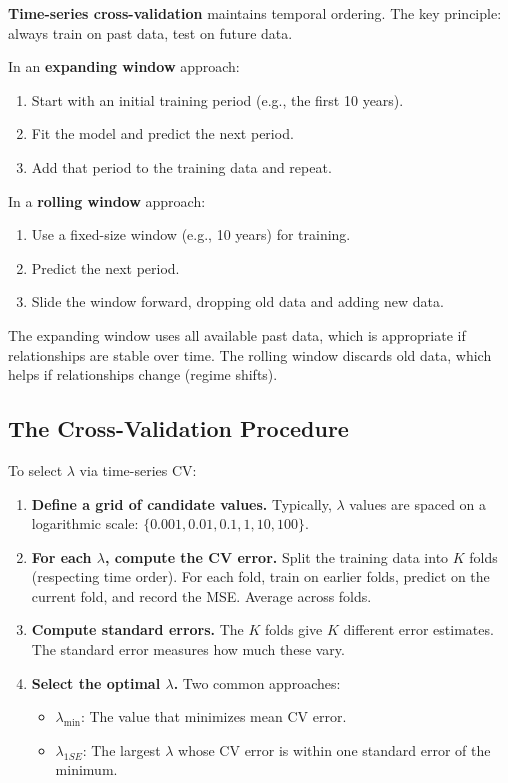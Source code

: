 \documentclass[11pt,a4paper]{article}
\newcommand{\keyword}[1]{\textbf{\textcolor{AccentOrange}{#1}}}
\begin{document}
\keyword{Time-series cross-validation} maintains temporal ordering. The key principle: always train on past data, test on future data.

In an \textbf{expanding window} approach:
\begin{enumerate}
    \item Start with an initial training period (e.g., the first 10 years).
    \item Fit the model and predict the next period.
    \item Add that period to the training data and repeat.
\end{enumerate}

In a \textbf{rolling window} approach:
\begin{enumerate}
    \item Use a fixed-size window (e.g., 10 years) for training.
    \item Predict the next period.
    \item Slide the window forward, dropping old data and adding new data.
\end{enumerate}

The expanding window uses all available past data, which is appropriate if relationships are stable over time. The rolling window discards old data, which helps if relationships change (regime shifts).

\subsection{The Cross-Validation Procedure}

To select $\lambda$ via time-series CV:

\begin{enumerate}
    \item \textbf{Define a grid of candidate values.} Typically, $\lambda$ values are spaced on a logarithmic scale: $\{0.001, 0.01, 0.1, 1, 10, 100\}$.
    
    \item \textbf{For each $\lambda$, compute the CV error.} Split the training data into $K$ folds (respecting time order). For each fold, train on earlier folds, predict on the current fold, and record the MSE. Average across folds.
    
    \item \textbf{Compute standard errors.} The $K$ folds give $K$ different error estimates. The standard error measures how much these vary.
    
    \item \textbf{Select the optimal $\lambda$.} Two common approaches:
    \begin{itemize}
        \item $\lambda_{\min}$: The value that minimizes mean CV error.
        \item $\lambda_{1SE}$: The largest $\lambda$ whose CV error is within one standard error of the minimum.
    \end{itemize}
\end{enumerate}
\end{document}
